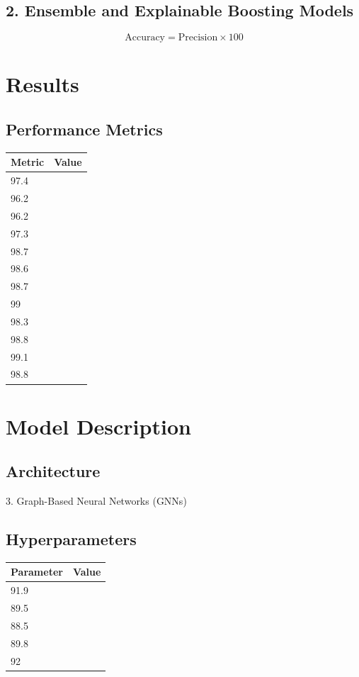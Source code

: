 \documentclass[twocolumn]{svjour3}
\begin{document}
\subsection{2. Ensemble and Explainable Boosting Models}
\begin{equation}
\text{Accuracy} = \text{Precision} \times 100
\end{equation}

\section{Results}
\subsection{Performance Metrics}
\begin{tabular}{|l|l|}
\hline
Metric & Value \\
\hline
97.4 & \\
96.2 & \\
96.2 & \\
97.3 & \\
98.7 & \\
98.6 & \\
98.7 & \\
99 & \\
98.3 & \\
98.8 & \\
99.1 & \\
98.8 & \\
\hline
\end{tabular}
\section{Model Description}
\subsection{Architecture}
3. Graph-Based Neural Networks (GNNs)
\subsection{Hyperparameters}
\begin{tabular}{|l|l|}
\hline
Parameter & Value \\
\hline
91.9 & \\
89.5 & \\
88.5 & \\
89.8 & \\
92 & \\
\hline
\end{tabular}
\end{document}
